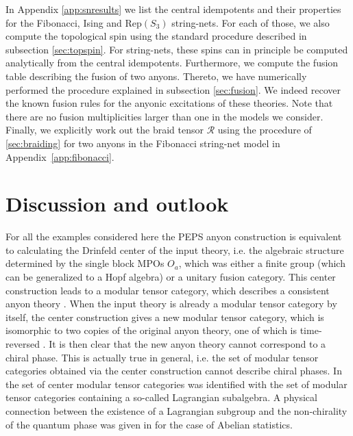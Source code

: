 \documentclass[12 pt]{article}
\begin{document}
In Appendix \ref{app:snresults} we list the central idempotents and their properties for the Fibonacci, Ising and $\text{Rep}(S_3)$ string-nets. For each of those, we also compute the topological spin using the standard procedure described in subsection \ref{sec:topspin}. For string-nets, these spins can in principle be computed analytically from the central idempotents. Furthermore, we compute the fusion table describing the fusion of two anyons. Thereto, we have numerically performed the procedure explained in subsection \ref{sec:fusion}. We indeed recover the known fusion rules for the anyonic excitations of these theories. Note that there are no fusion multiplicities larger than one in the models we consider. Finally, we explicitly work out the braid tensor $\mathcal{R}$ using the procedure of \ref{sec:braiding} for two anyons in the Fibonacci string-net model in Appendix~\ref{app:fibonacci}.




\section{Discussion and outlook}\label{sec:conclusions}

For all the examples considered here the PEPS anyon construction is equivalent to calculating the Drinfeld center \cite{drinfeld} of the input theory, i.e. the algebraic structure determined by the single block MPOs $O_a$, which was either a finite group (which can be generalized to a Hopf algebra) or a unitary fusion category. This center construction leads to a modular tensor category, which describes a consistent anyon theory \cite{DrinfeldCenter}. When the input theory is already a modular tensor category by itself, the center construction gives a new modular tensor category, which is isomorphic to two copies of the original anyon theory, one of which is time-reversed  \cite{DrinfeldCenter}. It is then clear that the new anyon theory cannot correspond to a chiral phase. This is actually true in general, i.e. the set of modular tensor categories obtained via the center construction cannot describe chiral phases.  In \cite{LagrangianAlgebra} the set of center modular tensor categories was identified with the set of modular tensor categories containing a so-called Lagrangian subalgebra. A physical connection between the existence of a Lagrangian subgroup and the non-chirality of the quantum phase was given in \cite{LevinEdges} for the case of Abelian statistics.
\end{document}
